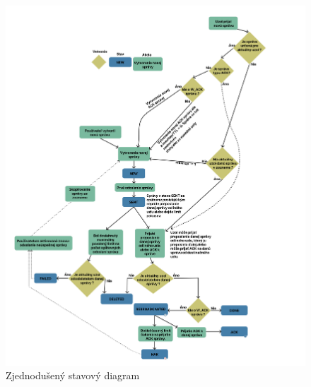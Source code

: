 \documentclass[slovak,master]{diploma}
\begin{document}
\appendix
\begin{figure}[]
  \centering
  \includegraphics[width=1\textwidth]{Figures/state_flow_W.png}
  \caption{Zjednodušený stavový diagram}
  \label{fig:stateDiagram}
\end{figure}
\end{document}
